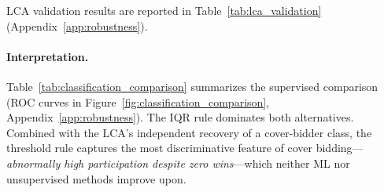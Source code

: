 LCA validation results are reported in Table~\ref{tab:lca_validation}
(Appendix~\ref{app:robustness}).

\paragraph{Interpretation.}
Table~\ref{tab:classification_comparison} summarizes the supervised
comparison (ROC curves in Figure~\ref{fig:classification_comparison},
Appendix~\ref{app:robustness}). The IQR rule dominates both alternatives. Combined with
the LCA's independent recovery of a cover-bidder class, the threshold
rule captures the most discriminative feature of cover
bidding---\emph{abnormally high participation despite zero wins}---which
neither ML nor unsupervised methods improve upon.


